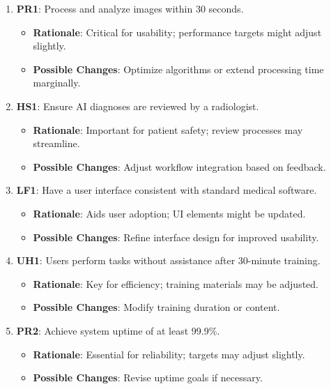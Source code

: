 \documentclass[12pt]{article}
\begin{document}
\begin{enumerate}[resume]
    \item \textbf{PR1}: Process and analyze images within 30 seconds.
    \begin{itemize}[label=-]
        \item \textbf{Rationale}: Critical for usability; performance targets might adjust slightly.
        \item \textbf{Possible Changes}: Optimize algorithms or extend processing time marginally.
    \end{itemize}

    \item \textbf{HS1}: Ensure AI diagnoses are reviewed by a radiologist.
    \begin{itemize}[label=-]
        \item \textbf{Rationale}: Important for patient safety; review processes may streamline.
        \item \textbf{Possible Changes}: Adjust workflow integration based on feedback.
    \end{itemize}

    \item \textbf{LF1}: Have a user interface consistent with standard medical software.
    \begin{itemize}[label=-]
        \item \textbf{Rationale}: Aids user adoption; UI elements might be updated.
        \item \textbf{Possible Changes}: Refine interface design for improved usability.
    \end{itemize}

    \item \textbf{UH1}: Users perform tasks without assistance after 30-minute training.
    \begin{itemize}[label=-]
        \item \textbf{Rationale}: Key for efficiency; training materials may be adjusted.
        \item \textbf{Possible Changes}: Modify training duration or content.
    \end{itemize}

    \item \textbf{PR2}: Achieve system uptime of at least 99.9\%.
    \begin{itemize}[label=-]
        \item \textbf{Rationale}: Essential for reliability; targets may adjust slightly.
        \item \textbf{Possible Changes}: Revise uptime goals if necessary.
    \end{itemize}


\end{enumerate}
\end{document}
